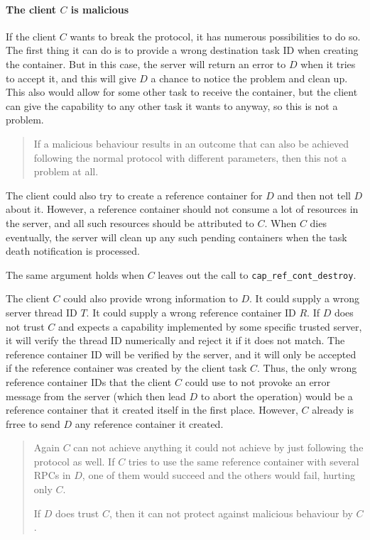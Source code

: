 \documentclass[9pt,a4paper]{extarticle}
\newenvironment{comment}{\footnotesize \begin{quote}}{\end{quote}}
\begin{document}
\paragraph{The client $C$ is malicious}

If the client $C$ wants to break the protocol, it has numerous
possibilities to do so.  The first thing it can do is to provide a
wrong destination task ID when creating the container.  But in this
case, the server will return an error to $D$ when it tries to accept
it, and this will give $D$ a chance to notice the problem and clean
up.  This also would allow for some other task to receive the
container, but the client can give the capability to any other task it
wants to anyway, so this is not a problem.

\begin{comment}
  If a malicious behaviour results in an outcome that can also be
  achieved following the normal protocol with different parameters,
  then this not a problem at all.
\end{comment}

The client could also try to create a reference container for $D$ and
then not tell $D$ about it.  However, a reference container should not
consume a lot of resources in the server, and all such resources
should be attributed to $C$.  When $C$ dies eventually, the server
will clean up any such pending containers when the task death
notification is processed.

The same argument holds when $C$ leaves out the call to
\verb/cap_ref_cont_destroy/.

The client $C$ could also provide wrong information to $D$.  It could
supply a wrong server thread ID $T$.  It could supply a wrong
reference container ID $R$.  If $D$ does not trust $C$ and expects a
capability implemented by some specific trusted server, it will verify
the thread ID numerically and reject it if it does not match.  The
reference container ID will be verified by the server, and it will
only be accepted if the reference container was created by the client
task $C$.  Thus, the only wrong reference container IDs that the
client $C$ could use to not provoke an error message from the server
(which then lead $D$ to abort the operation) would be a reference
container that it created itself in the first place.  However, $C$
already is frree to send $D$ any reference container it created.

\begin{comment}
  Again $C$ can not achieve anything it could not achieve by just
  following the protocol as well.  If $C$ tries to use the same
  reference container with several RPCs in $D$, one of them would
  succeed and the others would fail, hurting only $C$.
  
  If $D$ does trust $C$, then it can not protect against malicious
  behaviour by $C$.
\end{comment}
\end{document}

